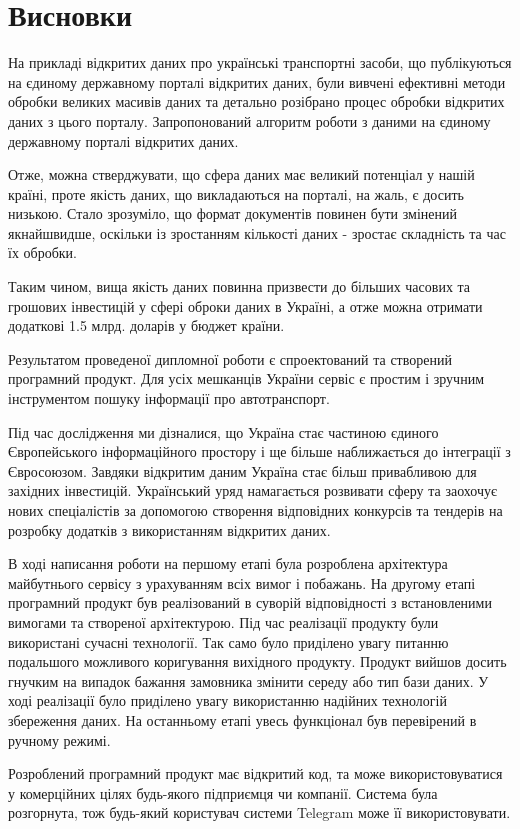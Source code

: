 \chapter*{Висновки}

На прикладі відкритих даних про українські транспортні засоби,
що публікуються на єдиному державному порталі відкритих даних, були
вивчені ефективні методи обробки великих масивів даних та
детально розібрано процес обробки відкритих даних з цього порталу.
Запропонований алгоритм роботи з даними на єдиному державному порталі відкритих даних.

Отже, можна стверджувати, що сфера даних має великий потенціал у нашій країні,
проте якість даних, що викладаються на порталі, на жаль, є досить низькою.
Стало зрозуміло, що формат документів повинен бути змінений якнайшвидше,
оскільки із зростанням кількості даних - зростає складність та час їх обробки.

Таким чином, вища якість даних повинна призвести до більших часових та грошових
інвестицій у сфері оброки даних в Україні,
а отже можна отримати додаткові 1.5 млрд. доларів у бюджет країни.

Результатом проведеної дипломної роботи є спроектований та створений програмний продукт.
Для усіх мешканців України сервіс є простим і зручним інструментом пошуку
інформації про автотранспорт.

Під час дослідження ми дізналися, що Україна стає частиною єдиного Європейського інформаційного простору
і ще більше наближається до інтеграції з Євросоюзом.
Завдяки відкритим даним Україна стає більш привабливою для західних інвестицій.
Український уряд намагається розвивати сферу та заохочує нових спеціалістів за допомогою створення відповідних конкурсів та
тендерів на розробку додатків з використанням відкритих даних.

В ході написання роботи на першому етапі була розроблена архітектура
майбутнього сервісу з урахуванням всіх вимог і побажань.
На другому етапі програмний продукт був реалізований в суворій відповідності з
встановленими вимогами та створеної архітектурою.
Під час реалізації продукту були використані сучасні технології.
Так само було приділено увагу питанню подальшого
можливого коригування вихідного продукту. Продукт вийшов
досить гнучким на випадок бажання замовника змінити середу або
тип бази даних. У ході реалізації було приділено увагу
використанню надійних технологій збереження даних.
На останньому етапі увесь функціонал був перевірений в ручному режимі.

Розроблений програмний продукт має відкритий код, та може використовуватися у комерційних цілях будь-якого підприємця чи компанії.
Система була розгорнута, тож будь-який користувач системи Telegram може її використовувати.

